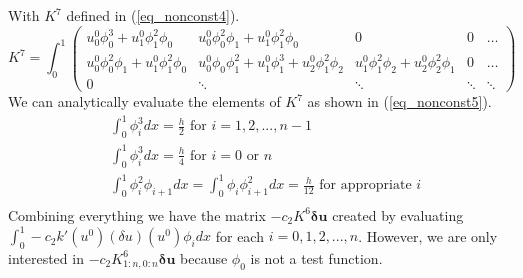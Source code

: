 \documentclass[11pt,fleqn]{article}
\theoremstyle{defstyle}
\begin{document}
With $K^7$ defined in (\ref{eq_nonconst4}).
\begin{equation}
K^7 = \int_0^1\begin{pmatrix}
u^0_0\phi_0^3 +u^0_1\phi_1^2\phi_0 & u^0_0\phi_0^2\phi_1 + u^0_1\phi_1^2\phi_0 & 0 & 0& \hdots\\
u^0_0\phi_0^2\phi_1 + u^0_1\phi_1^2\phi_0 & u_0^0\phi_0\phi_1^2 +u^0_1\phi_1^3 + u^0_2\phi_1^2\phi_2 & u^0_1\phi_1^2\phi_2 + u^0_2\phi_2^2\phi_1 & 0 &\hdots \\
0 & \ddots & \ddots & \ddots & \ddots  
\end{pmatrix}
\label{eq_nonconst4}
\end{equation}
We can analytically evaluate the elements of $K^7$ as shown in (\ref{eq_nonconst5}).
\begin{equation}
\begin{aligned}
&\int_0^1 \phi_i^3 dx = \frac{h}{2} \text{ for } i=1,2,...,n-1\\
&\int_0^1 \phi_i^3 dx = \frac{h}{4} \text{ for } i=0 \text{ or } n\\
&\int_0^1 \phi_i^2\phi_{i+1} dx = \int_0^1 \phi_i\phi_{i+1}^2 dx = \frac{h}{12} \text{ for appropriate } i \\
\end{aligned}
\label{eq_nonconst5}
\end{equation}
Combining everything we have the matrix $-c_2K^6\mathbf{\delta u}$ created by evaluating $\int_0^1 -c_2 k\prime(u^0)(\delta u )(u^0) \phi_i dx$ for each $i=0,1,2,...,n$. However, we are only interested in $-c_2K^6_{1:n,0:n}\mathbf{\delta u}$ because $\phi_0$ is not a test function.
\end{document}
